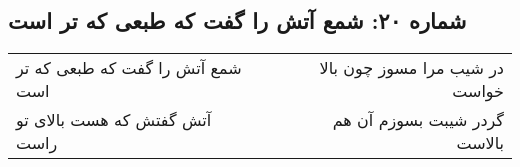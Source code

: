 \begin{center}
\section*{شماره ۲۰: شمع آتش را گفت که طبعی که تر است}
\label{sec:020}
\begin{longtable}{l p{0.5cm} r}
شمع آتش را گفت که طبعی که تر است
&&
در شیب مرا مسوز چون بالا خواست
\\
آتش گفتش که هست بالای تو راست
&&
گردر شیبت بسوزم آن هم بالاست
\\
\end{longtable}
\end{center}
